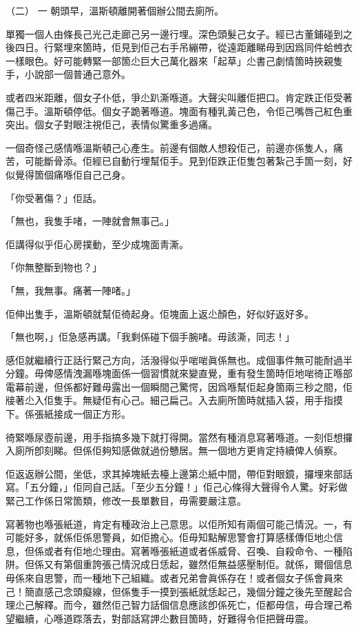 （二）
一
朝頭早，溫斯頓離開著個辦公間去廁所。

單獨一個人由條長己光己走廊己另一邊行埋。深色頭髮己女子。經已古董鋪碰到之後四日。行緊埋來箇時，佢見到佢己右手吊繃帶，從遠距離睇毋到因爲同件蛤乸衣一樣眼色。好可能轉緊一部箇尐巨大己萬化器來「起草」尐書己劇情箇時挾親隻手，小說部一個普通己意外。

或者四米距離，個女子仆低，爭尐趴澌喺道。大聲尖叫離佢把口。肯定跌正佢受著傷己手。溫斯頓停低。個女子跪著喺道。塊面有種乳黃己色，令佢己嘴唇己紅色重突出。個女子對眼注視佢己，表情似驚重多過痛。

一個奇怪己感情喺溫斯頓己心產生。前邊有個敵人想殺佢己，前邊亦係隻人，痛苦，可能斷骨添。佢經已自動行埋幫佢手。見到佢跌正佢隻包著紮己手箇一刻，好似覺得箇個痛喺佢自己己身。

「你受著傷？」佢話。

「無也，我隻手啫，一陣就會無事己。」

佢講得似乎佢心房撲動，至少成塊面靑澌。

「你無整斷到物也？」

「無，我無事。痛著一陣啫。」

佢伸出隻手，溫斯頓就幫佢徛起身。佢塊面上返尐顏色，好似好返好多。

「無也啊，」佢急感再講。「我剩係碰下個手腕啫。毋該澌，同志！」

感佢就繼續行正話行緊己方向，活潑得似乎啱啱眞係無也。成個事件無可能耐過半分鐘。毋俾感情洩漏喺塊面係一個習慣就來變直覺，重有發生箇時佢地啱徛正喺部電幕前邊，但係都好難毋露出一個瞬間己驚愕，因爲喺幫佢起身箇兩三秒之間，佢𤗈著尐入佢隻手。無疑佢有心己。細己扁己。入去廁所箇時就插入袋，用手指摸下。係張紙接成一個正方形。

徛緊喺尿壺前邊，用手指搞多幾下就打得開。當然有種消息寫著喺道。一刻佢想攞入廁所卽刻睇。但係佢夠知感做就過份戇居。無一個地方更肯定持續俾人偵察。

佢返返辦公間，坐低，求其掉塊紙去檯上邊第尐紙中間，帶佢對眼鏡，攞埋來部話寫。「五分鐘，」佢同自己話。「至少五分鐘！」佢己心條得大聲得令人驚。好彩做緊己工作係日常箇類，修改一長單數目，毋需要嚴注意。

寫著物也喺張紙道，肯定有種政治上己意思。以佢所知有兩個可能己情況。一，有可能好多，就係佢係思警員，如佢擔心。佢毋知點解思警會打算感樣傳佢地尐信息，但係或者有佢地尐理由。寫著喺張紙道或者係威脅、召喚、自殺命令、一種陷阱。但係又有第個重誇張己情況成日恁起，雖然佢無益感壓制佢。就係，爾個信息毋係來自思警，而一種地下己組織。或者兄弟會眞係存在！或者個女子係會員來己！簡直感己念頭癡線，但係隻手一摸到張紙就恁起己，幾個分鐘之後先至醒起合理尐己解釋。而今，雖然佢己智力話個信息應該卽係死亡，佢都毋信，毋合理己希望繼續，心喺道𨂽落去，對部話寫䛅尐數目箇時，好難得令佢把聲毋震。

